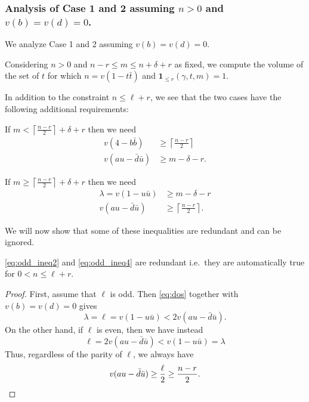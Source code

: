 \subsubsection{Analysis of Case 1 and 2 assuming $n > 0$ and $v(b) = v(d) = 0$.}
We analyze Case 1 and 2 assuming $v(b) = v(d) = 0$.

Considering $n > 0$ and $n-r \le m \le n+\delta+r$ as fixed,
we compute the volume of the set of $t$
for which $n = v(1-t\bar t)$ and $\mathbf{1}_{\le r}(\gamma,t,m) = 1$.

In addition to the constraint $n \le \ell + r$,
we see that the two cases have the following additional requirements:
\begin{description}
  \ii[Case 1.] If $m < \left\lceil \frac{n-r}{2} \right\rceil + \delta + r$ then we need
  \begin{align}
    v(4-b\bar b) &\ge \left\lceil \frac{n-r}{2} \right\rceil \label{eq:odd_ineq1} \\
    v(au - \bar d \bar u) &\ge m - \delta - r \label{eq:odd_ineq2}.
  \end{align}

  \ii[Case 2.] If $m \geq \left\lceil \frac{n-r}{2} \right\rceil + \delta + r$ then we need
  \begin{align}
    \lambda = v(1-u \bar u) &\ge m-\delta-r \label{eq:odd_ineq3} \\
    v(au - \bar d \bar u) &\ge \left\lceil \frac{n-r}{2} \right\rceil \label{eq:odd_ineq4}.
  \end{align}
\end{description}

We will now show that some of these inequalities are redundant and can be ignored.

\begin{claim}
  \eqref{eq:odd_ineq2} and \eqref{eq:odd_ineq4} are redundant
  i.e.\ they are automatically true for $0 < n \le \ell + r$.
\end{claim}
\begin{proof}
  First, assume that $\ell$ is odd.
  Then \eqref{eq:dos} together with $v(b) = v(d) = 0$ gives
  \begin{equation}
    \lambda = \ell = v(1-u \bar u) < 2v(au - \bar d \bar u).
    \label{eq:odd_center_distance}
  \end{equation}
  On the other hand, if $\ell$ is even, then we have instead
  \begin{equation}
    \ell = 2v(au - \bar d \bar u) < v(1-u\bar u) = \lambda
    \label{eq:even_center_distance_case12}
  \end{equation}
  Thus, regardless of the parity of $\ell$, we always have
  \[ v(au - \bar d \bar u) \ge \frac{\ell}{2} \ge \frac{n-r}{2}. \qedhere \]
\end{proof}

